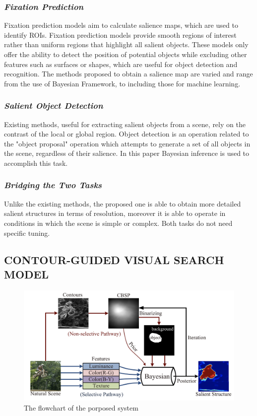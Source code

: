 \subsubsection{\emph{Fixation Prediction}}
Fixation prediction models aim to calculate salience maps, which are used to 
identify ROIs. Fixation prediction models provide smooth regions of interest 
rather than uniform regions that highlight all salient objects. These models 
only offer the ability to detect the position of potential objects while excluding 
other features such as surfaces or shapes, which are useful for object 
detection and recognition. The methods proposed to obtain a salience map 
are varied and range from the use of Bayesian Framework, to including those 
for machine learning. 

\subsubsection{\emph{Salient Object Detection}}
Existing methods, useful for extracting salient objects from a scene, rely on 
the contrast of the local or global region. Object detection is an operation 
related to the "object proposal" operation which attempts to generate a set 
of all objects in the scene, regardless of their salience. In this paper Bayesian 
inference is used to accomplish this task.

\subsubsection{\emph{Bridging the Two Tasks}}
Unlike the existing methods, the proposed one is able to obtain more detailed 
salient structures in terms of resolution, moreover it is able to operate in 
conditions in which the scene is simple or complex. Both tasks do not need 
specific tuning.

\subsection{CONTOUR-GUIDED VISUAL SEARCH MODEL}

\begin{figure}[htbp]
    \centering
    \includegraphics[width = 0.8\linewidth]{images/selective and non-selective pathways.png}
    \centering
    \caption{The flowchart of the porposed system}
    \label{fid: flowchart}
\end{figure}


